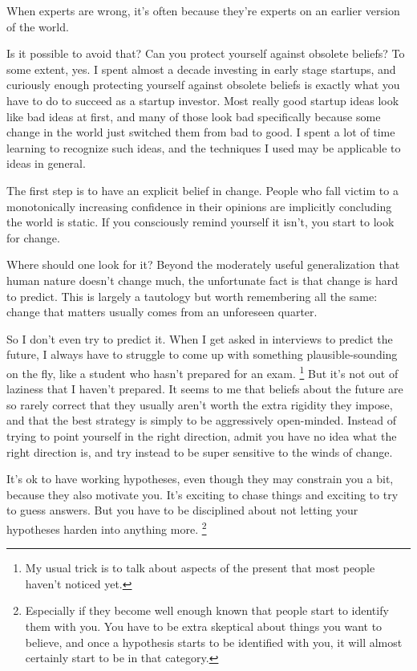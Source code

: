 \documentclass[12pt]{book}
\begin{document}
When experts are wrong, it's often because they're experts on an earlier
version of the world.

Is it possible to avoid that? Can you protect yourself against obsolete
beliefs? To some extent, yes. I spent almost a decade investing in early
stage startups, and curiously enough protecting yourself against
obsolete beliefs is exactly what you have to do to succeed as a startup
investor. Most really good startup ideas look like bad ideas at first,
and many of those look bad specifically because some change in the world
just switched them from bad to good. I spent a lot of time learning to
recognize such ideas, and the techniques I used may be applicable to
ideas in general.

The first step is to have an explicit belief in change. People who fall
victim to a monotonically increasing confidence in their opinions are
implicitly concluding the world is static. If you consciously remind
yourself it isn't, you start to look for change.

Where should one look for it? Beyond the moderately useful
generalization that human nature doesn't change much, the unfortunate
fact is that change is hard to predict. This is largely a tautology but
worth remembering all the same: change that matters usually comes from
an unforeseen quarter.

So I don't even try to predict it. When I get asked in interviews to
predict the future, I always have to struggle to come up with something
plausible-sounding on the fly, like a student who hasn't prepared for an
exam. \footnote{My usual trick is to talk about aspects of the present that most
people haven't noticed yet.} But it's not out of laziness that I
haven't prepared. It seems to me that beliefs about the future are so
rarely correct that they usually aren't worth the extra rigidity they
impose, and that the best strategy is simply to be aggressively
open-minded. Instead of trying to point yourself in the right direction,
admit you have no idea what the right direction is, and try instead to
be super sensitive to the winds of change.

It's ok to have working hypotheses, even though they may constrain you a
bit, because they also motivate you. It's exciting to chase things and
exciting to try to guess answers. But you have to be disciplined about
not letting your hypotheses harden into anything more.
\footnote{Especially if they become well enough known that people start to
identify them with you. You have to be extra skeptical about things you
want to believe, and once a hypothesis starts to be identified with you,
it will almost certainly start to be in that category.}
\end{document}
